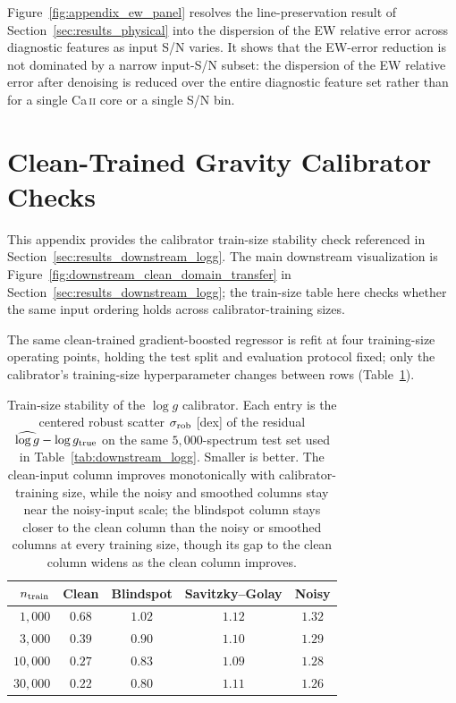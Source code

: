 \documentclass[twocolumn]{aastex7}
\newcounter{protocol}
\begin{document}
Figure~\ref{fig:appendix_ew_panel} resolves the line-preservation result of Section~\ref{sec:results_physical} into the dispersion of the EW relative error across diagnostic features as input S/N varies. It shows that the EW-error reduction is not dominated by a narrow input-S/N subset: the dispersion of the EW relative error after denoising is reduced over the entire diagnostic feature set rather than for a single Ca\,\textsc{ii} core or a single S/N bin.

\section{Clean-Trained Gravity Calibrator Checks}
\label{app:downstream_logg}

This appendix provides the calibrator train-size stability check referenced in Section~\ref{sec:results_downstream_logg}. The main downstream visualization is Figure~\ref{fig:downstream_clean_domain_transfer} in Section~\ref{sec:results_downstream_logg}; the train-size table here checks whether the same input ordering holds across calibrator-training sizes.

The same clean-trained gradient-boosted regressor is refit at four training-size operating points, holding the test split and evaluation protocol fixed; only the calibrator's training-size hyperparameter changes between rows (Table~\ref{tab:downstream_logg_sweep}).

\begin{table}
\centering
\begin{tabular}{rcccc}
\hline
$n_{\rm train}$ & Clean & Blindspot & Savitzky--Golay & Noisy \\
\hline
$1{,}000$  & $0.68$ & $1.02$ & $1.12$ & $1.32$ \\
$3{,}000$  & $0.39$ & $0.90$ & $1.10$ & $1.29$ \\
$10{,}000$ & $0.27$ & $0.83$ & $1.09$ & $1.28$ \\
$30{,}000$ & $0.22$ & $0.80$ & $1.11$ & $1.26$ \\
\hline
\end{tabular}
\caption{Train-size stability of the $\log g$ calibrator. Each entry is the centered robust scatter $\sigma_{\rm rob}$ [dex] of the residual $\widehat{\log g}-\log g_{\rm true}$ on the same $5{,}000$-spectrum test set used in Table~\ref{tab:downstream_logg}. Smaller is better. The clean-input column improves monotonically with calibrator-training size, while the noisy and smoothed columns stay near the noisy-input scale; the blindspot column stays closer to the clean column than the noisy or smoothed columns at every training size, though its gap to the clean column widens as the clean column improves.}
\label{tab:downstream_logg_sweep}
\end{table}
\end{document}
